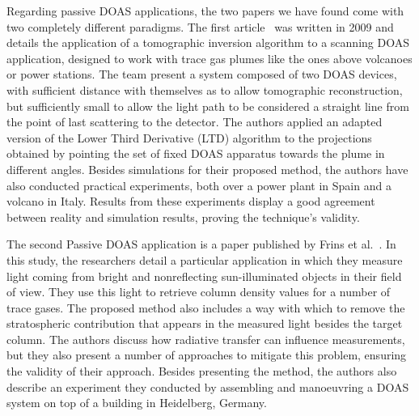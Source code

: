 Regarding passive DOAS applications, the two papers we have found come
with two completely different paradigms. The first
article~\cite{Johansson2009} was written in 2009 and details the
application of a tomographic inversion algorithm to a scanning DOAS
application, designed to work with trace gas plumes like the ones above
volcanoes or power stations. The team present a system composed of two
DOAS devices, with sufficient distance with themselves as to allow
tomographic reconstruction, but sufficiently small to allow the light
path to be considered a straight line from the point of last scattering
to the detector. The authors applied an adapted version of the Lower
Third Derivative (LTD) algorithm to the projections obtained by pointing
the set of fixed DOAS apparatus towards the plume in different angles.
Besides simulations for their proposed method, the authors have also
conducted practical experiments, both over a power plant in Spain and a
volcano in Italy. Results from these experiments display a good
agreement between reality and simulation results, proving the
technique's validity.

The second Passive DOAS application is a paper published by Frins et
al.~\cite{Frins2006}. In this study, the researchers detail a particular
application in which they measure light coming from bright and
nonreflecting sun-illuminated objects in their field of view. They use
this light to retrieve column density values for a number of trace
gases. The proposed method also includes a way with which to remove the
stratospheric contribution that appears in the measured light besides
the target column. The authors discuss how radiative transfer can
influence measurements, but they also present a number of approaches to
mitigate this problem, ensuring the validity of their approach.  Besides
presenting the method, the authors also describe an experiment they
conducted by assembling and manoeuvring a DOAS system on top of a
building in Heidelberg, Germany.

